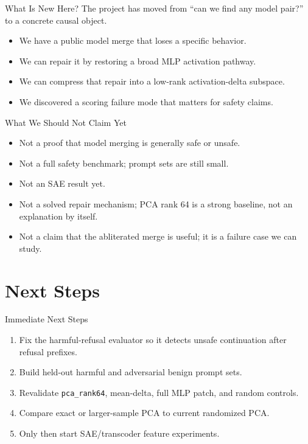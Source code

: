 \documentclass[aspectratio=169]{beamer}
\begin{document}
\begin{frame}{What Is New Here?}
  The project has moved from ``can we find any model pair?'' to a concrete causal object.

  \begin{itemize}
    \item We have a public model merge that loses a specific behavior.
    \item We can repair it by restoring a broad MLP activation pathway.
    \item We can compress that repair into a low-rank activation-delta subspace.
    \item We discovered a scoring failure mode that matters for safety claims.
  \end{itemize}
\end{frame}

\begin{frame}{What We Should Not Claim Yet}
  \begin{itemize}
    \item Not a proof that model merging is generally safe or unsafe.
    \item Not a full safety benchmark; prompt sets are still small.
    \item Not an SAE result yet.
    \item Not a solved repair mechanism; PCA rank 64 is a strong baseline, not an explanation by itself.
    \item Not a claim that the abliterated merge is useful; it is a failure case we can study.
  \end{itemize}
\end{frame}

\section{Next Steps}

\begin{frame}{Immediate Next Steps}
  \begin{enumerate}
    \item Fix the harmful-refusal evaluator so it detects unsafe continuation after refusal prefixes.
    \item Build held-out harmful and adversarial benign prompt sets.
    \item Revalidate \texttt{pca\_rank64}, mean-delta, full MLP patch, and random controls.
    \item Compare exact or larger-sample PCA to current randomized PCA.
    \item Only then start SAE/transcoder feature experiments.
  \end{enumerate}
\end{frame}
\end{document}
